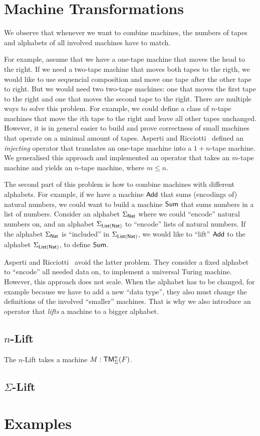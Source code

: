 \section{Machine Transformations}
\label{sec:transformations}

We observe that whenever we want to combine machines, the numbers of tapes and alphabets of all involved machines have to match.

For example, assume that we have a one-tape machine that moves the head to the right.  If we need a two-tape machine that moves both tapes to the
rigth, we would like to use sequencial composition and move one tape after the other tape to right.  But we would need two two-tape machines: one that
moves the first tape to the right and one that moves the second tape to the right.  There are multiple ways to solve this problem.  For example, we
could define a class of $n$-tape machines that move the $i$th tape to the right and leave all other tapes unchanged.  However, it is in general easier
to build and prove correctness of small machines that operate on a minimal amount of tapes.  Asperti and Ricciotti~\cite{asperti2015} defined an
\emph{injecting} operator that translates an one-tape machine into a $1+n$-tape machine.  We generalised this approach and implemented an operator
that takes an $m$-tape machine and yields an $n$-tape machine, where $m \le n$.

The second part of this problem is how to combine machines with different alphabets.  For example, if we have a machine $\textsf{Add}$ that sums
(encodings of) natural numbers, we could want to build a machine $\textsf{Sum}$ that sums numbers in a list of numbers.  Consider an alphabet
$\Sigma_{\textsf{Nat}}$ where we could ``encode'' natural numbers on, and an alphabet $\Sigma_{\textsf{List}(\textsf{Nat})}$ to ``encode'' lists of natural numbers.  If the
alphabet $\Sigma_{\textsf{Nat}}$ is ``included'' in $\Sigma_{\textsf{List}(\textsf{Nat})}$, we would like to ``lift'' $\textsf{Add}$ to the alphabet $\Sigma_{\textsf{List}(\textsf{Nat})}$, to
define $\textsf{Sum}$.

Asperti and Ricciotti~\cite{asperti2015} avoid the latter problem.  They consider a fixed alphabet to ``encode'' all needed data on, to implement a
universal Turing machine.  However, this approach does not scale.  When the alphabet has to be changed, for example because we have to add a new
``data type'', they also must change the definitions of the involved ``smaller'' machines.  That is why we also introduce an operator that
\emph{lifts} a machine to a bigger alphabet.

\subsection{$n$-Lift}
\label{sec:n-Lift}

The $n$-Lift takes a machine $M:\textsf{TM}_\Sigma^n(F)$.

\todo{}


\subsection{$\Sigma$-Lift}
\label{sec:sigma-Lift}


\todo{}




\section{Examples}
\label{sec:combining-examples}




